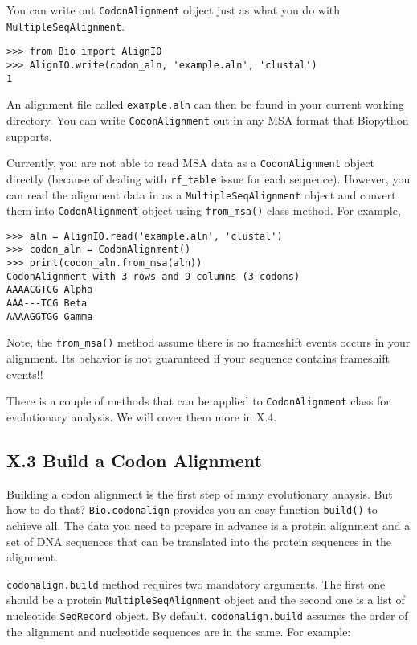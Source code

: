 \documentclass{article}
\begin{document}
You can write out \texttt{CodonAlignment} object just as what you do
with \texttt{MultipleSeqAlignment}.

\begin{verbatim}
>>> from Bio import AlignIO
>>> AlignIO.write(codon_aln, 'example.aln', 'clustal')
1
\end{verbatim}

An alignment file called \texttt{example.aln} can then be found in your
current working directory. You can write \texttt{CodonAlignment} out in
any MSA format that Biopython supports.

Currently, you are not able to read MSA data as a
\texttt{CodonAlignment} object directly (because of dealing with
\texttt{rf\_table} issue for each sequence). However, you can read the
alignment data in as a \texttt{MultipleSeqAlignment} object and convert
them into \texttt{CodonAlignment} object using \texttt{from\_msa()}
class method. For example,

\begin{verbatim}
>>> aln = AlignIO.read('example.aln', 'clustal')
>>> codon_aln = CodonAlignment()
>>> print(codon_aln.from_msa(aln))
CodonAlignment with 3 rows and 9 columns (3 codons)
AAAACGTCG Alpha
AAA---TCG Beta
AAAAGGTGG Gamma
\end{verbatim}

Note, the \texttt{from\_msa()} method assume there is no frameshift
events occurs in your alignment. Its behavior is not guaranteed if your
sequence contains frameshift events!!

There is a couple of methods that can be applied to
\texttt{CodonAlignment} class for evolutionary analysis. We will cover
them more in X.4.

\subsection{X.3 Build a Codon Alignment}

Building a codon alignment is the first step of many evolutionary
anaysis. But how to do that? \texttt{Bio.codonalign} provides you an
easy function \texttt{build()} to achieve all. The data you need to
prepare in advance is a protein alignment and a set of DNA sequences
that can be translated into the protein sequences in the alignment.

\texttt{codonalign.build} method requires two mandatory arguments. The
first one should be a protein \texttt{MultipleSeqAlignment} object and
the second one is a list of nucleotide \texttt{SeqRecord} object. By
default, \texttt{codonalign.build} assumes the order of the alignment
and nucleotide sequences are in the same. For example:
\end{document}
